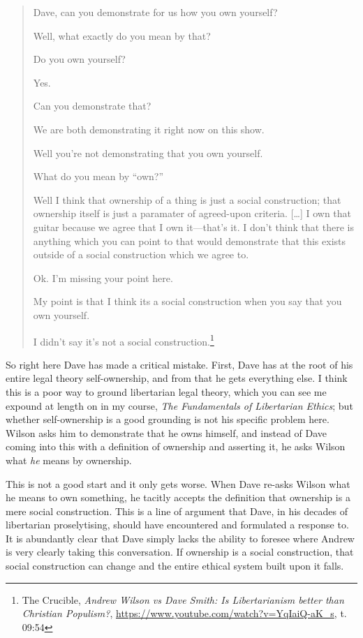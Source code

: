 \documentclass[11pt]{article}
\begin{document}
\begin{quote}
Dave, can you demonstrate for us how you own yourself?

Well, what exactly do you mean by that?

Do you own yourself?

Yes.

Can you demonstrate that?

We are both demonstrating it right now on this show.

Well you're not demonstrating that you own yourself.

What do you mean by ``own?''

Well I think that ownership of a thing is just a social construction; that ownership itself is just a paramater of agreed-upon criteria. [\ldots{}] I own that guitar because we agree that I own it---that's it. I don't think that there is anything which you can point to that would demonstrate that this exists outside of a social construction which we agree to.

Ok. I'm missing your point here.

My point is that I think its a social construction when you say that you own yourself.

I didn't say it's not a social construction.\footnote{The Crucible, \emph{Andrew Wilson vs Dave Smith: Is Libertarianism better than Christian Populism?}, \url{https://www.youtube.com/watch?v=YqIaiQ-aK\_s}, t. 09:54}
\end{quote}

So right here Dave has made a critical mistake. First, Dave has at the root of his entire legal theory self-ownership, and from that he gets everything else. I think this is a poor way to ground libertarian legal theory, which you can see me expound at length on in my course, \emph{The Fundamentals of Libertarian Ethics}; but whether self-ownership is a good grounding is not his specific problem here. Wilson asks him to demonstrate that he owns himself, and instead of Dave coming into this with a definition of ownership and asserting it, he asks Wilson what \emph{he} means by ownership.

This is not a good start and it only gets worse. When Dave re-asks Wilson what he means to own something, he tacitly accepts the definition that ownership is a mere social construction. This is a line of argument that Dave, in his decades of libertarian proselytising, should have encountered and formulated a response to. It is abundantly clear that Dave simply lacks the ability to foresee where Andrew is very clearly taking this conversation. If ownership is a social construction, that social construction can change and the entire ethical system built upon it falls.
\end{document}
